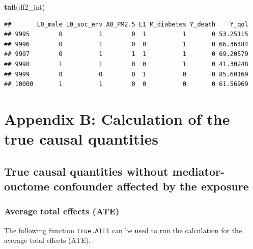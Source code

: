 \documentclass[
]{book}
\newenvironment{Shaded}{\begin{snugshade}}{\end{snugshade}}
\newcommand{\FunctionTok}[1]{\textcolor[rgb]{0.13,0.29,0.53}{\textbf{#1}}}
\newcommand{\NormalTok}[1]{#1}
\begin{document}
\begin{Shaded}
\begin{Highlighting}[]
\FunctionTok{tail}\NormalTok{(df2\_int)}
\end{Highlighting}
\end{Shaded}

\begin{verbatim}
##       L0_male L0_soc_env A0_PM2.5 L1 M_diabetes Y_death    Y_qol
## 9995        0          1        0  1          1       0 53.25115
## 9996        0          1        0  0          1       0 66.36484
## 9997        0          1        1  1          1       0 69.20579
## 9998        1          1        0  0          1       0 41.30248
## 9999        0          0        0  1          0       0 85.60169
## 10000       1          1        0  0          0       0 61.56969
\end{verbatim}

\chapter{Appendix B: Calculation of the true causal quantities}\label{appendix_b}

\section{True causal quantities without mediator-ouctome confounder affected by the exposure}\label{true-causal-quantities-without-mediator-ouctome-confounder-affected-by-the-exposure}

\subsection{Average total effects (ATE)}\label{average-total-effects-ate}

The following function \texttt{true.ATE1} can be used to run the calculation for the average total effects (ATE).
\end{document}
